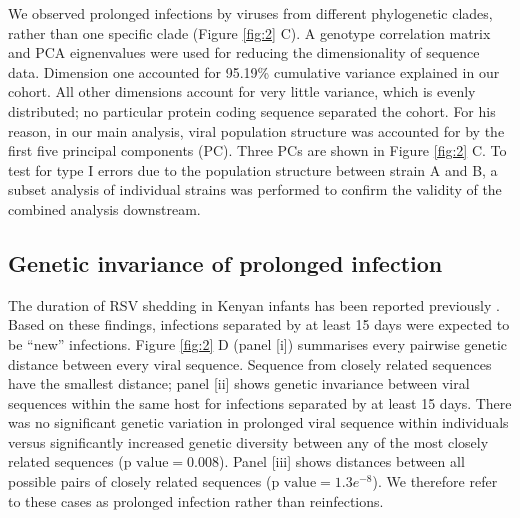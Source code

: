 \documentclass{article} %
\begin{document}
We observed prolonged infections by viruses from different phylogenetic clades, rather than one specific clade 
(Figure \ref{fig:2} C).
A genotype correlation matrix and PCA eignenvalues were used for reducing the dimensionality of sequence data.
Dimension one accounted for 95.19\% cumulative variance explained in our cohort.
All other dimensions account for very little variance, which is evenly distributed; no particular protein coding sequence separated the cohort.
For his reason, in our main analysis, viral population structure was accounted for by the first five principal components (PC). 
Three PCs are shown in Figure \ref{fig:2} C.
To test for type I errors due to the population structure between strain A and B, 
a subset analysis of individual strains was performed to confirm the validity of the combined analysis downstream.


\subsection{Genetic invariance of prolonged infection}
The duration of RSV shedding in Kenyan infants has been reported previously
\citep{okiro2010duration}.
Based on these findings, infections separated by at least 15 days were expected to be ``new'' infections. 
Figure \ref{fig:2} D (panel [i]) summarises every pairwise genetic distance between every viral sequence.
Sequence from closely related sequences have the smallest distance; panel [ii] shows genetic invariance between viral sequences within the same host for infections separated by at least 15 days. 
There was no significant genetic variation in prolonged viral sequence within individuals versus significantly increased genetic diversity between any of the most closely related sequences ($\text{p value} = 0.008$).
Panel [iii] shows distances between all possible pairs of closely related sequences ($\text{p value} = 1.3e^{-8}$).
We therefore refer to these cases as prolonged infection rather than reinfections.
\end{document}
